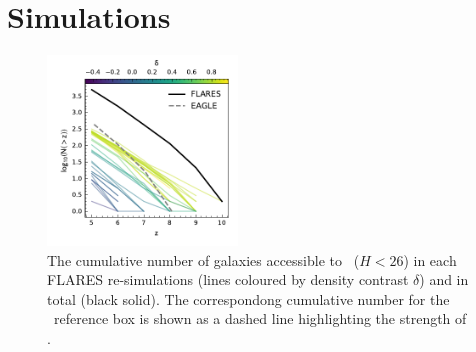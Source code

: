 

\section{Simulations}


\begin{figure}
	\centering
	\includegraphics[width=0.45\textwidth]{./figures/N}
	\caption{The cumulative number of galaxies accessible to \euclid\ ($H<26$) in each FLARES re-simulations (lines coloured by density contrast $\delta$) and in total (black solid). The correspondong cumulative number for the \eagle\ reference box is shown as a dashed line highlighting the strength of \flares. \label{fig:N}}
\end{figure}
